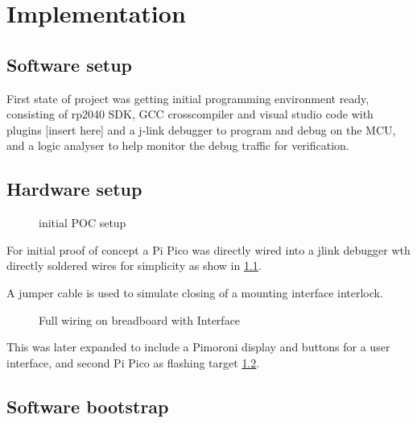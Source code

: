 \vspace{21.5pt}
\chapter{Implementation}
\section{Software  setup}

First state of project was getting initial programming environment ready, consisting of rp2040 SDK, GCC crosscompiler and visual studio code with plugins [insert here] and a j-link debugger to program and debug on the MCU, and a logic analyser to help monitor the debug traffic for verification.

\section{Hardware setup}

\begin{figure}[ht]
	\centering
	\caption{initial POC setup}
	\label{fig:InitialPOCwiring}
\end{figure}

For initial proof of concept a Pi Pico was directly wired into a jlink debugger wth directly soldered wires for simplicity as show in \ref{fig:InitialPOCwiring}.

A jumper cable is used to simulate closing of a mounting interface interlock.

\pagebreak
\begin{figure}[ht]
	\centering
	\caption{Full wiring on breadboard with Interface}
	\label{fig:FullPOCwiring}
\end{figure}

This was later expanded to include a Pimoroni display and buttons for a user interface, and second Pi Pico as flashing target \ref{fig:FullPOCwiring}.

\section{Software bootstrap}

